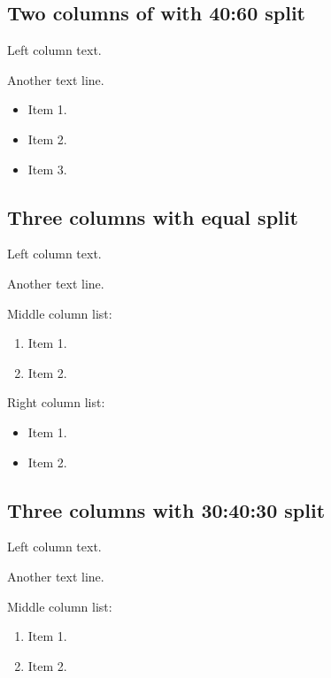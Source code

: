 \documentclass[
]{beamer}
\providecommand{\tightlist}{%
  \setlength{\itemsep}{0pt}\setlength{\parskip}{0pt}}
\begin{document}
\hypertarget{two-columns-of-with-4060-split}{%
\subsection{Two columns of with 40:60
split}\label{two-columns-of-with-4060-split}}

Left column text.

Another text line.

\begin{itemize}
\tightlist
\item
  Item 1.
\item
  Item 2.
\item
  Item 3.
\end{itemize}

\hypertarget{three-columns-with-equal-split}{%
\subsection{Three columns with equal
split}\label{three-columns-with-equal-split}}

Left column text.

Another text line.

Middle column list:

\begin{enumerate}
\def\labelenumi{\arabic{enumi}.}
\tightlist
\item
  Item 1.
\item
  Item 2.
\end{enumerate}

Right column list:

\begin{itemize}
\tightlist
\item
  Item 1.
\item
  Item 2.
\end{itemize}

\hypertarget{three-columns-with-304030-split}{%
\subsection{Three columns with 30:40:30
split}\label{three-columns-with-304030-split}}

Left column text.

Another text line.

Middle column list:

\begin{enumerate}
\def\labelenumi{\arabic{enumi}.}
\tightlist
\item
  Item 1.
\item
  Item 2.
\end{enumerate}
\end{document}

